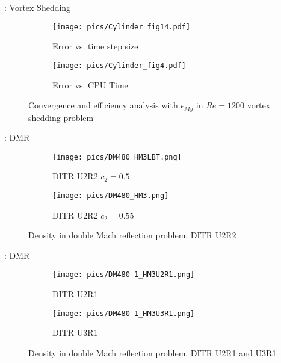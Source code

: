 \documentclass[aspectratio=169,serif]{beamer} %
\begin{document}
\begin{frame}{\secname: Vortex Shedding}
  \scriptsize
  \begin{figure}[htbp]
    \centering
    \begin{subfigure}{0.5\textwidth}
        \texttt{[image: pics/Cylinder\_fig14.pdf]}
        \caption[]{Error vs. time step size}
        \label{sfig:CylinderRe1200_My_C}
    \end{subfigure}\hfill
    \begin{subfigure}{0.5\textwidth}
        \texttt{[image: pics/Cylinder\_fig4.pdf]}
        \caption[]{Error vs. CPU Time}
        \label{sfig:CylinderRe1200_My_E}
    \end{subfigure}
    \caption[]{Convergence and efficiency analysis with $\epsilon_{My}$ in $Re=1200$ vortex shedding problem}
    \label{fig:CylinderRe1200_My}
  \end{figure}
\end{frame}

\begin{frame}{\secname: DMR}
  \scriptsize
  \begin{figure}[htbp]
    \centering
    \begin{subfigure}{0.5\textwidth}
        \texttt{[image: pics/DM480\_HM3LBT.png]}
        \caption[]{DITR U2R2 $c_2=0.5$}
        \label{sfig:DM480_HM3LBT}
    \end{subfigure}\hfill
    \begin{subfigure}{0.5\textwidth}
        \texttt{[image: pics/DM480\_HM3.png]}
        \caption[]{DITR U2R2 $c_2=0.55$}
        \label{sfig:DM480_HM3}
    \end{subfigure}
    \caption{Density in double Mach reflection problem, DITR U2R2}
    \label{fig:DM480-1}
  \end{figure}
\end{frame}

\begin{frame}{\secname: DMR}
  \scriptsize
  \begin{figure}[htbp]
    \centering
    \begin{subfigure}{0.5\textwidth}
        \texttt{[image: pics/DM480-1\_HM3U2R1.png]}
        \caption[]{DITR U2R1}
        \label{sfig:DM480_HM3U2R1}
    \end{subfigure}\hfill
    \begin{subfigure}{0.5\textwidth}
        \texttt{[image: pics/DM480-1\_HM3U3R1.png]}
        \caption[]{DITR U3R1}
        \label{sfig:DM480_HM3U3R1}
    \end{subfigure}
    \caption{Density in double Mach reflection problem, DITR U2R1 and U3R1}
    \label{fig:DM480-2}
  \end{figure}
\end{frame}
\end{document}
